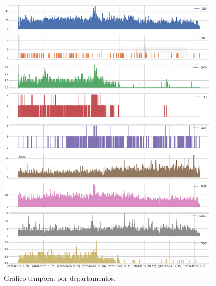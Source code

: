 \documentclass[a4paper,12pt]{article}
\begin{document}
\begin{figure}[H]
	\begin{center}
	\includegraphics[width=1\textwidth]{multi_dpto.png}
  	\caption{Gráfico temporal por departamentos.}
  	\label{fig:graf_mult_dpto}
  	\end{center}
\end{figure}
\end{document}
